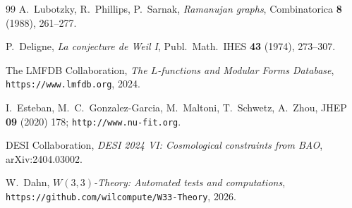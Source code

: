 \documentclass[12pt]{article}
\begin{document}
\begin{thebibliography}{99}
  A.~Lubotzky, R.~Phillips, P.~Sarnak,
  \emph{Ramanujan graphs},
  Combinatorica \textbf{8} (1988), 261--277.

  P.~Deligne,
  \emph{La conjecture de Weil I},
  Publ.\ Math.\ IHES \textbf{43} (1974), 273--307.

  The LMFDB Collaboration,
  \emph{The $L$-functions and Modular Forms Database},
  \texttt{https://www.lmfdb.org}, 2024.

  I.~Esteban, M.~C.~Gonzalez-Garcia, M.~Maltoni, T.~Schwetz, A.~Zhou,
  JHEP \textbf{09} (2020) 178; \texttt{http://www.nu-fit.org}.

  DESI Collaboration,
  \emph{DESI 2024 VI: Cosmological constraints from BAO},
  arXiv:2404.03002.

  W.~Dahn,
  \emph{$W(3,3)$-Theory: Automated tests and computations},
  \texttt{https://github.com/wilcompute/W33-Theory}, 2026.
\end{thebibliography}
\end{document}

